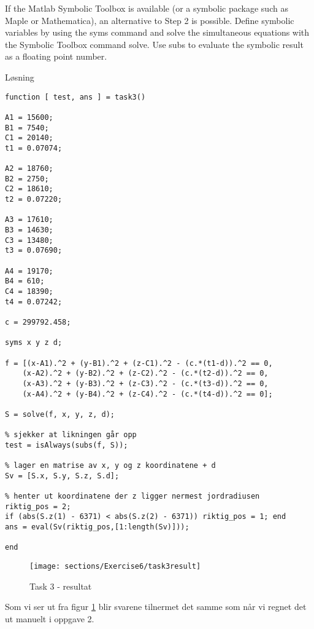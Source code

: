 % 

If the Matlab Symbolic Toolbox is available (or a symbolic package such as Maple
or Mathematica), an alternative to Step 2 is possible. Define symbolic variables by using the syms command and solve the simultaneous equations with the Symbolic Toolbox command solve. Use subs to evaluate the symbolic result as a floating point number.

\vspace{5mm}

Løsning


\begin{lstlisting}[caption={Task3.m}]
function [ test, ans ] = task3()

A1 = 15600;
B1 = 7540;
C1 = 20140;
t1 = 0.07074;

A2 = 18760;
B2 = 2750;
C2 = 18610;
t2 = 0.07220;

A3 = 17610;
B3 = 14630;
C3 = 13480;
t3 = 0.07690;

A4 = 19170;
B4 = 610;
C4 = 18390;
t4 = 0.07242;

c = 299792.458;

syms x y z d;

f = [(x-A1).^2 + (y-B1).^2 + (z-C1).^2 - (c.*(t1-d)).^2 == 0,
    (x-A2).^2 + (y-B2).^2 + (z-C2).^2 - (c.*(t2-d)).^2 == 0, 
    (x-A3).^2 + (y-B3).^2 + (z-C3).^2 - (c.*(t3-d)).^2 == 0, 
    (x-A4).^2 + (y-B4).^2 + (z-C4).^2 - (c.*(t4-d)).^2 == 0];

S = solve(f, x, y, z, d);

% sjekker at likningen går opp
test = isAlways(subs(f, S));

% lager en matrise av x, y og z koordinatene + d
Sv = [S.x, S.y, S.z, S.d];

% henter ut koordinatene der z ligger nermest jordradiusen
riktig_pos = 2;
if (abs(S.z(1) - 6371) < abs(S.z(2) - 6371)) riktig_pos = 1; end
ans = eval(Sv(riktig_pos,[1:length(Sv)]));

end
\end{lstlisting}

\begin{figure}[h]
    \centering
    \texttt{[image: sections/Exercise6/task3result]}
    \caption{Task 3 - resultat}
    \label{fig:task3result}
\end{figure}

Som vi ser ut fra figur \ref{fig:task3result} blir svarene tilnermet det samme som når vi regnet det ut manuelt i oppgave 2.

% 